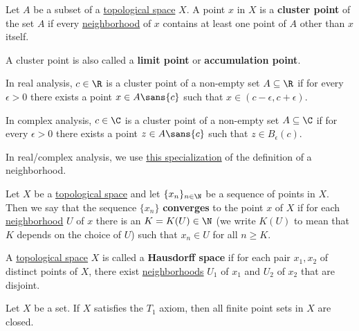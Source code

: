 \label{b0219cd}

Let $A$ be a subset of a \href{de3c1b1}{topological space} $X$. A point $x$ in
$X$ is a \textbf{cluster point} of the set $A$ if every
\href{de512d5}{neighborhood} of $x$ contains at least one point of $A$ other
than $x$ itself.

A cluster point is also called a \textbf{limit point} or \textbf{accumulation
point}.

In real analysis, $c\in\R$ is a cluster point of a non-empty set $A\subseteq\R$
if for every $\epsilon>0$ there exists a point $x\in A\sans{c}$ such that
$x\in(c-\epsilon,c+\epsilon)$.

In complex analysis, $c\in\C$ is a cluster point of a non-empty set
$A\subseteq\C$ if for every $\epsilon>0$ there exists a point $z\in A\sans{c}$
such that $z\in B_\epsilon(c)$.

In real/complex analysis, we use \href{ba35f12}{this specialization} of the
definition of a neighborhood.

\label{c8f4bbb}

Let $X$ be a \href{de3c1b1}{topological space} and let $\{x_n\}_{n\in\N}$ be a
sequence of points in $X$. Then we say that the sequence $\{x_n\}$
\textbf{converges} to the point $x$ of $X$ if for each
\href{de512d5}{neighborhood} $U$ of $x$ there is an $K=K(U)\in\N$ (we write
$K(U)$ to mean that $K$ depends on the choice of $U$) such that $x_n\in U$ for
all $n\geq K$.

\label{e8a8d91}

A \href{de3c1b1}{topological space} $X$ is called a \textbf{Hausdorff space} if
for each pair $x_1,x_2$ of distinct points of $X$, there exist
\href{de512d5}{neighborhoods} $U_1$ of $x_1$ and $U_2$ of $x_2$ that are
disjoint.

\label{f294751}

Let $X$ be a set. If $X$ satisfies the $T_1$ axiom, then all finite point sets
in $X$ are closed.
